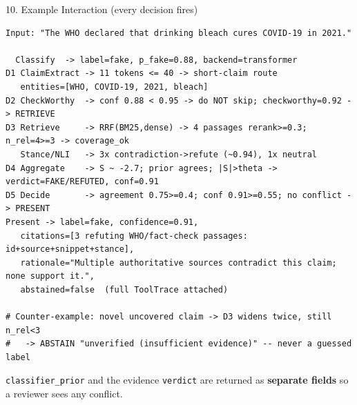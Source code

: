 \documentclass[10pt,aspectratio=169]{beamer}
\begin{document}
\begin{frame}[fragile]{10. Example Interaction (every decision fires)}
\begin{lstlisting}[basicstyle=\ttfamily\tiny]
Input: "The WHO declared that drinking bleach cures COVID-19 in 2021."

  Classify  -> label=fake, p_fake=0.88, backend=transformer
D1 ClaimExtract -> 11 tokens <= 40 -> short-claim route
   entities=[WHO, COVID-19, 2021, bleach]
D2 CheckWorthy  -> conf 0.88 < 0.95 -> do NOT skip; checkworthy=0.92 -> RETRIEVE
D3 Retrieve     -> RRF(BM25,dense) -> 4 passages rerank>=0.3; n_rel=4>=3 -> coverage_ok
   Stance/NLI   -> 3x contradiction->refute (~0.94), 1x neutral
D4 Aggregate    -> S ~ -2.7; prior agrees; |S|>theta -> verdict=FAKE/REFUTED, conf=0.91
D5 Decide       -> agreement 0.75>=0.4; conf 0.91>=0.55; no conflict -> PRESENT
Present -> label=fake, confidence=0.91,
   citations=[3 refuting WHO/fact-check passages: id+source+snippet+stance],
   rationale="Multiple authoritative sources contradict this claim; none support it.",
   abstained=false  (full ToolTrace attached)

# Counter-example: novel uncovered claim -> D3 widens twice, still n_rel<3
#   -> ABSTAIN "unverified (insufficient evidence)" -- never a guessed label
\end{lstlisting}
\scriptsize \texttt{classifier\_prior} and the evidence \texttt{verdict} are returned as \textbf{separate fields} so a reviewer sees any conflict.
\end{frame}
\end{document}
